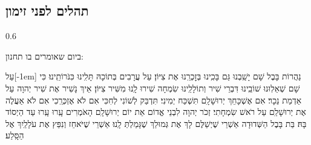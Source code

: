 \documentclass[11pt,twoside]{article}
\newcommand{\instruction}[1]{%
\ifhmode\else\noindent\fi%
{\plain\tiny{#1}}%
}
\newcommand{\mekor}[2][0pt]{\marginnote{\rashi\tiny\scalebox{0.9}[1]{#2}}[#1]}
\newcommand{\ps}[0]{תה׳\xspace}
\begin{document}
\begin{samepage}
\subsection{תהלים לפני זימון}

\begin{russian}
\begin{floatingfigure}[r]{0.6\textwidth}
\end{floatingfigure}
\end{russian}%

\instruction{ביום שאומרים בו תחנון:}

עַל\mekor[-1em]{\ps קלז} נַהֲרוֹת בָּבֶל שָׁם יָשַֽׁבְנוּ גַּם בָּכִֽינוּ בְּזׇכְרֵֽנוּ אֶת צִיּוֹן׃ עַל
עֲרָבִים בְּתוֹכָהּ תָּלִֽינוּ כִּנֹּרוֹתֵֽינוּ׃ כִּי שָׁם שְׁאֵלֽוּנוּ שׁוֹבֵֽינוּ דִּבְרֵי שִׁיר וְתוֹלָלֵֽינוּ שִׂמְחָה
שִׁירוּ לָֽנוּ מִשִּׁיר צִיּוֹן׃ אֵיךְ נָשִׁיר אֶת שִׁיר יְהוָה עַל אַדְמַת נֵכָר׃ אִם אֶשְׁכָּחֵךְ
יְרוּשָׁלָ‍ִם תִּשְׁכַּח יְמִינִי׃ תִּדְבַּק לְשׁוֹנִי לְחִכִּי אִם לֹא אֶזְכְּרֵֽכִי אִם לֹא אַעֲלֶה אֶת
יְרוּשָׁלַ‍ִם עַל רֹאשׁ שִׂמְחָתִי׃ זְכֹר יְהוָה לִבְנֵי אֱדוֹם אֵת יוֹם יְרוּשָׁלָ‍ִם
הָאֹמְרִים עָֽרוּ עָֽרוּ עַד הַיְסוֹד בָּהּ׃ בַּת בָּבֶל הַשְּׁדוּדָה אַשְׁרֵי שֶׁיְשַׁלֶּם לָךְ אֶת גְּמוּלֵךְ שֶׁגָּמַלְתְּ
לָֽנוּ׃ אַשְׁרֵי שֶׁיֹּאחֵז וְנִפֵּץ אֶת עֹלָלַֽיִךְ אֶל הַסָּֽלַע׃
\end{samepage}
\end{document}
